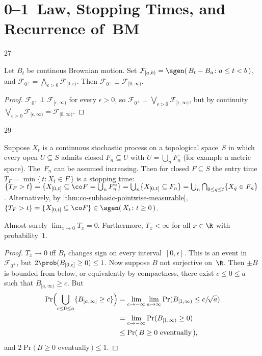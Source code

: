 \section	{0--1~Law, Stopping Times, and Recurrence of~BM}

\setcounter	{block}	{27}
\begin	{theorem}[0--1~law]
Let $B_t$ be continous Brownian motion.
Set \( \mathcal F_{[a,b)} = \sgen(\, B_t - B_a \colon a \le t < b \,) \),
and \( \mathcal F_{0^+} = \bigwedge_{\epsilon>0} \mathcal F_{[0,\epsilon)} \).
Then \( \mathcal F_{0^+} \perp \mathcal F_{[0,\infty)} \).
\end	{theorem}
\begin	{proof}
\( \mathcal F_{0^+} \perp \mathcal F_{[\epsilon,\infty)} \)
for every \( \epsilon > 0 \),
so \( \mathcal F_{0^+}
\perp \bigvee_{\epsilon>0} \mathcal F_{[\epsilon,\infty)} \),
but by continuity \( \bigvee_{\epsilon>0} \mathcal F_{[\epsilon,\infty)}
= \mathcal F_{[0,\infty)} \).
\end	{proof}

\setcounter	{block}	{29}
\begin	{remark}
Suppose $X_t$ is a continuous stochastic process
on a topological space~$S$
in which every open \( U \subseteq S \) admits closed \( F_n \subseteq U \)
with \( U = \bigcup_n F_n^\circ \)
(for example a metric space).
The~$F_n$ can be assumed increasing.
Then for closed \( F \subseteq S \)
the entry time \( T_F = \min\{\, t \colon X_t \in F \,\} \)
is a stopping time:
\(	\{ T_F > t \}
=	\{ X_{[0,t]} \subseteq \co F = \bigcup_n F_n^\circ \}
=	\bigcup_n \{ X_{[0,t]} \subseteq F_n \}
=	\bigcup_n \bigcap_{0\le q\le t} \{ X_q \in F_n \}
\).
Alternatively, by \autoref{thm:co-subbasic-pointwise-measurable},
\( \{T_F > t\} = \{X_{[0,t]} \subseteq \co F\}
\in \sgen(\, X_t \colon t \ge 0 \,) \).
\end	{remark}

\begin	{proposition}
Almost surely \( \lim_{x\to0} T_x = 0 \).
Furthermore, \( T_x < \infty \) for all \( x \in \R \)
with probability~$1$.
\end	{proposition}
\begin	{proof}
\( T_x \to 0 \) iff $B_t$ changes sign on every interval~$[0,\epsilon]$.
This is an event in~$\mathcal F_{0^+}$,
but \( 2\prob(B_{[0,\epsilon]} \ge 0) \le 1 \).
Now suppose $B$ not surjective on~$\R$.
Then \( \pm B \) is bounded from below,
or equivalently by compactness,
there exist \( c \le 0 \le a \) such that \( B_{[a,\infty)} \ge c \).
But
\begin	{align*}
	\Pr\Bigl( \bigcup_{c \le 0 \le a} \{ B_{[a,\infty]} \ge c \} \Bigr)
	&=	\lim_{c\to-\infty} \lim_{a\to\infty}
			\Pr( B_{[1,\infty)} \le c/\!\sqrt a ) \\
	&=	\lim_{c\to-\infty}
			\Pr( B_{[1,\infty)} \ge 0 ) \\
	&\le	\Pr(\,\text{\( B \ge 0 \) eventually}\,) \text,
\end	{align*}
and \( 2\Pr(\, B \ge 0 \) eventually\(\,) \le 1 \).
\end	{proof}

